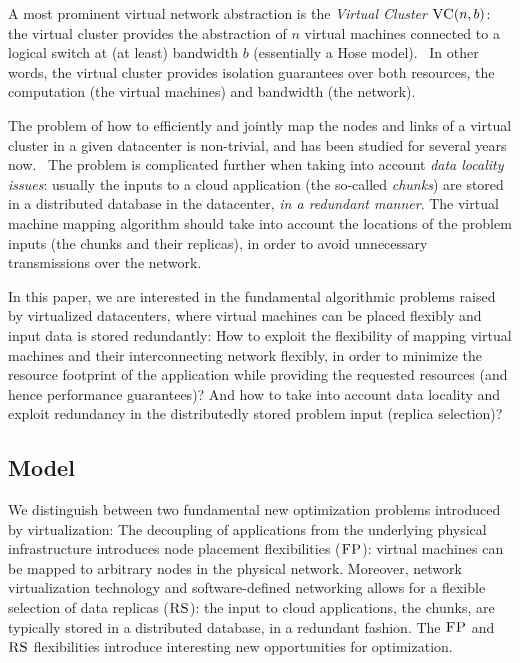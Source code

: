 \documentclass[11pt,a4paper]{scrartcl}
\newcommand{\VC}{\textsc{VC}}
\newcommand{\FP}{\textsc{FP}}
\newcommand{\RS}{\textsc{RS}}
\begin{document}
A most prominent virtual network abstraction is the \emph{Virtual Cluster} $\VC(n,b)$:  
the virtual cluster provides the abstraction of $n$ virtual machines connected to a logical
switch at (at least) bandwidth $b$ (essentially a Hose model).~\cite{oktopus} 
In other words, the virtual cluster provides isolation guarantees over both resources, 
the computation (the virtual machines) and bandwidth (the network). 

The problem of how to efficiently and jointly map the nodes and links of a virtual cluster in a given datacenter is non-trivial,
and has been studied for several years now.~\cite{oktopus,proteus,secondnet} The problem is complicated further when taking into account
\emph{data locality issues}: usually the inputs to a cloud application (the so-called \emph{chunks}) 
are stored in a 
distributed database in the datacenter, \emph{in a redundant manner}. The virtual machine mapping algorithm should take into account 
the locations
of the problem inputs (the chunks and their replicas), in order to avoid unnecessary transmissions over the network.

In this paper, we are interested in the fundamental algorithmic problems raised by virtualized datacenters,
where virtual machines can be placed flexibly and input data is stored redundantly: 
How to exploit the flexibility of mapping virtual machines and their interconnecting
network flexibly, in order to minimize the resource footprint of the application while providing
the requested resources (and hence performance guarantees)? 
And how to take into account data locality and exploit
redundancy in the distributedly stored problem input (replica selection)?  

\subsection{Model}

We distinguish between two fundamental new optimization problems introduced by virtualization: 
The decoupling of applications from the underlying physical infrastructure introduces node placement flexibilities ($\FP$):
virtual machines can be mapped to arbitrary nodes in the physical network. Moreover, 
network virtualization technology and software-defined networking allows for a flexible selection of data replicas ($\RS$): 
the input to cloud applications, the chunks, are typically stored in a distributed database, in a redundant fashion.
The $\FP$ and $\RS$ flexibilities introduce interesting new opportunities for optimization.   
 
\end{document}
